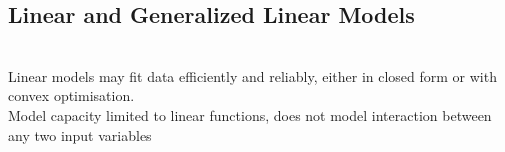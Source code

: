 \subsection{Linear and Generalized Linear Models}

\begin{remark} \\
Linear models may fit data efficiently and reliably, either in closed form or with convex optimisation.\\
Model capacity limited to linear functions, does not model interaction between any two input variables
\end{remark}
